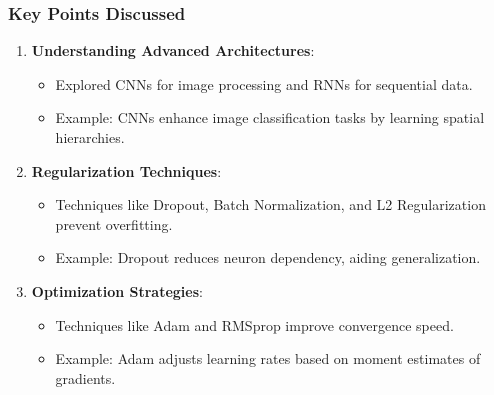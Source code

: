 \documentclass[aspectratio=169]{beamer}
\begin{document}
\begin{frame}[fragile]
    \frametitle{Key Points Discussed}
    
    \begin{enumerate}
        \item \textbf{Understanding Advanced Architectures}:
        \begin{itemize}
            \item Explored CNNs for image processing and RNNs for sequential data.
            \item Example: CNNs enhance image classification tasks by learning spatial hierarchies.
        \end{itemize}
        
        \item \textbf{Regularization Techniques}:
        \begin{itemize}
            \item Techniques like Dropout, Batch Normalization, and L2 Regularization prevent overfitting.
            \item Example: Dropout reduces neuron dependency, aiding generalization.
        \end{itemize}
        
        \item \textbf{Optimization Strategies}:
        \begin{itemize}
            \item Techniques like Adam and RMSprop improve convergence speed.
            \item Example: Adam adjusts learning rates based on moment estimates of gradients.
        \end{itemize}
    \end{enumerate}
\end{frame}
\end{document}
